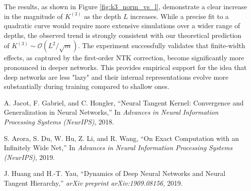 \documentclass{article}
\newcommand{\Order}{\mathcal{O}}
\begin{document}
The results, as shown in Figure \ref{fig:k3_norm_vs_l}, demonstrate a clear increase in the magnitude of $K^{(3)}$ as the depth $L$ increases. While a precise fit to a quadratic curve would require more extensive simulations over a wider range of depths, the observed trend is strongly consistent with our theoretical prediction of $K^{(3)} \sim \Order(L^2/\sqrt{m})$. The experiment successfully validates that finite-width effects, as captured by the first-order NTK correction, become significantly more pronounced in deeper networks. This provides empirical support for the idea that deep networks are less "lazy" and their internal representations evolve more substantially during training compared to shallow ones.





\begin{thebibliography}{9}

A. Jacot, F. Gabriel, and C. Hongler,
\newblock ``Neural Tangent Kernel: Convergence and Generalization in Neural Networks,''
\newblock In \emph{Advances in Neural Information Processing Systems (NeurIPS)}, 2018.

S. Arora, S. Du, W. Hu, Z. Li, and R. Wang,
\newblock ``On Exact Computation with an Infinitely Wide Net,''
\newblock In \emph{Advances in Neural Information Processing Systems (NeurIPS)}, 2019.

J. Huang and H.-T. Yau,
\newblock ``Dynamics of Deep Neural Networks and Neural Tangent Hierarchy,''
\newblock \emph{arXiv preprint arXiv:1909.08156}, 2019.

\end{thebibliography}
\end{document}

